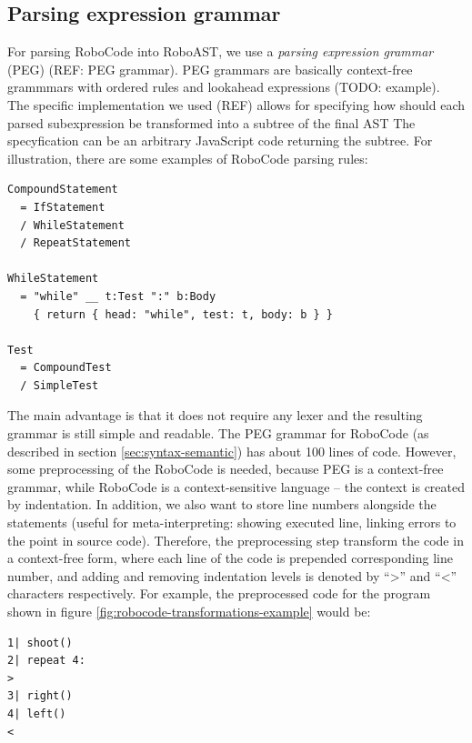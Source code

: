 

\subsection{Parsing expression grammar}

For parsing RoboCode into RoboAST, we use a \emph{parsing expression grammar}
(PEG) (REF: PEG grammar).
PEG grammars are basically context-free grammmars with ordered rules
and lookahead expressions (TODO: example).
The specific implementation we used (REF) allows for specifying how should each
parsed subexpression be transformed into a subtree of the final AST
The specyfication can be an arbitrary JavaScript code returning the subtree.
For illustration, there are some examples of RoboCode parsing rules:

\begin{lstlisting}
CompoundStatement
  = IfStatement
  / WhileStatement
  / RepeatStatement

WhileStatement
  = "while" __ t:Test ":" b:Body
    { return { head: "while", test: t, body: b } }

Test
  = CompoundTest
  / SimpleTest
\end{lstlisting}

The main advantage is that it does not require any lexer and the resulting grammar
is still simple and readable.
The PEG grammar for RoboCode (as described in section \ref{sec:syntax-semantic})
has about 100 lines of code.
However, some preprocessing of the RoboCode is needed, because
PEG is a context-free grammar,
while RoboCode is a context-sensitive language
-- the context is created by indentation.
In addition, we also want to store line numbers alongside the statements
(useful for meta-interpreting:
showing executed line,
linking errors to the point in source code).
Therefore, the preprocessing step transform the code in a context-free form,
where each line of the code is prepended corresponding line number,
and adding and removing indentation levels is denoted by ``>'' and ``<'' characters respectively.
For example, the preprocessed code for the program shown in figure
\ref{fig:robocode-transformations-example} would be:

\begin{lstlisting}
1| shoot()
2| repeat 4:
>
3| right()
4| left()
<
\end{lstlisting}

